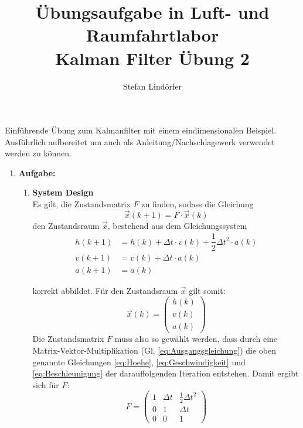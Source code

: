\documentclass[12pt,a4paper]{article}
\begin{document}
	\title{Übungsaufgabe in Luft- und Raumfahrtlabor\\Kalman Filter Übung 2}
	\author{Stefan Lindörfer}
	\maketitle{}
Einführende Übung zum Kalmanfilter mit einem eindimensionalen Beispiel. Ausführlich aufbereitet um auch als Anleitung/Nachschlagewerk verwendet werden zu können.
	\begin{enumerate}[label=\textbf{\arabic*})] %
		\item \textbf{Aufgabe:}\label{sub:Aufgabe1}\\
		
		\begin{enumerate}[label=\textbf{\alph*})] %
			\item \textbf{System Design}\label{subsec:Task1a}\\
			Es gilt, die Zustandsmatrix $F$ zu finden, sodass die Gleichung
			\begin{equation}\label{eq:Ausgangsgleichung}
				\vec{x}(k+1)=F\cdot \vec{x}(k)
			\end{equation}
			den Zustandsraum $\vec{x}$, bestehend aus dem Gleichungssystem		
			\begin{align}
				h(k+1)&=h(k)+\Delta t\cdot v(k) + \dfrac{1}{2}\Delta t^{2}\cdot a(k)\label{eq:Hoehe}\\
				v(k+1)&=v(k)+\Delta t\cdot a(k)\label{eq:Geschwindigkeit}\\
				a(k+1)&=a(k)\label{eq:Beschleunigung}
			\end{align}
			
			
    		korrekt abbildet. Für den Zustandsraum $\vec{x}$ gilt somit:
    		\begin{equation}\label{eq:Zustandsraum}
				\vec{x}(k)=
				\begin{pmatrix}
					h(k)\\
					v(k)\\
					a(k)
				\end{pmatrix}
    		\end{equation}
    		Die Zustandsmatrix $F$ muss also so gewählt werden, dass durch eine Matrix-Vektor-Multiplikation (Gl. \ref{eq:Ausgangsgleichung}) die oben genannte Gleichungen \ref{eq:Hoehe}, \ref{eq:Geschwindigkeit} und \ref{eq:Beschleunigung} der darauffolgenden Iteration entstehen. Damit ergibt sich für $F$:\\
			\begin{equation}\label{eq:ZustandsmatrixF}
			F =
			\begin{pmatrix}
				1 & \Delta t & \frac{1}{2}\Delta t^{2} \\
				0 & 1 & \Delta t \\
				0 & 0 & 1
			\end{pmatrix}		
			\end{equation}
			

\end{enumerate}
\end{enumerate}
\end{document}
